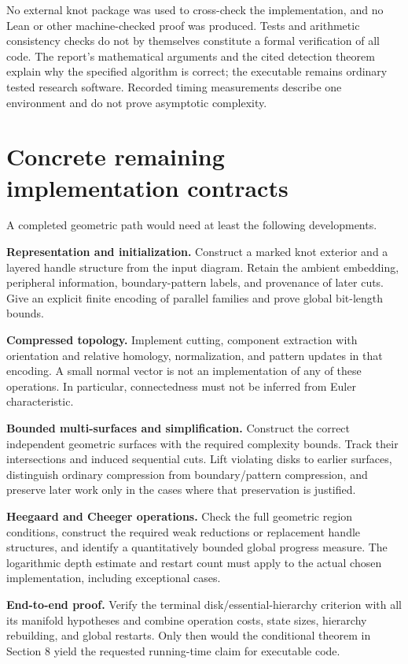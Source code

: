 \documentclass[11pt]{article}
\theoremstyle{definition}
\begin{document}
No external knot package was used to cross-check the implementation, and no
Lean or other machine-checked proof was produced. Tests and arithmetic
consistency checks do not by themselves constitute a formal verification of
all code. The report's mathematical arguments and the cited detection theorem
explain why the specified algorithm is correct; the executable remains ordinary
tested research software. Recorded timing measurements describe one environment
and do not prove asymptotic complexity.

\section{Concrete remaining implementation contracts}

A completed geometric path would need at least the following developments.

\textbf{Representation and initialization.}
Construct a marked knot exterior and a layered handle structure from the input
diagram. Retain the ambient embedding, peripheral information, boundary-pattern
labels, and provenance of later cuts. Give an explicit finite encoding of
parallel families and prove global bit-length bounds.

\textbf{Compressed topology.}
Implement cutting, component extraction with orientation and relative homology,
normalization, and pattern updates in that encoding. A small normal vector is
not an implementation of any of these operations. In particular, connectedness
must not be inferred from Euler characteristic.

\textbf{Bounded multi-surfaces and simplification.}
Construct the correct independent geometric surfaces with the required
complexity bounds. Track their intersections and induced sequential cuts. Lift
violating disks to earlier surfaces, distinguish ordinary compression from
boundary/pattern compression, and preserve later work only in the cases where
that preservation is justified.

\textbf{Heegaard and Cheeger operations.}
Check the full geometric region conditions, construct the required weak
reductions or replacement handle structures, and identify a quantitatively
bounded global progress measure. The logarithmic depth estimate and restart
count must apply to the actual chosen implementation, including exceptional
cases.

\textbf{End-to-end proof.}
Verify the terminal disk/essential-hierarchy criterion with all its manifold
hypotheses and combine operation costs, state sizes, hierarchy rebuilding, and
global restarts. Only then would the conditional theorem in Section 8 yield
the requested running-time claim for executable code.
\end{document}
